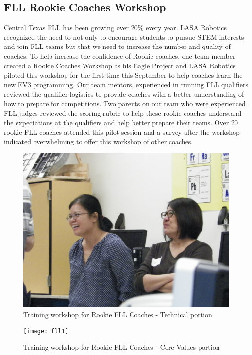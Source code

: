 \subsection{FLL Rookie Coaches Workshop}
Central Texas FLL has been growing over 20\% every year.  LASA Robotics recognized the need to not only to encourage students to pursue STEM interests and join FLL teams but that we need to increase the number and quality of coaches.  To help increase the confidence of Rookie coaches, one team member created a Rookie Coaches Workshop as his Eagle Project and LASA Robotics piloted this workshop for the first time this September to help coaches learn the new EV3 programming.   Our team mentors, experienced in running FLL qualifiers reviewed the qualifier logistics to provide coaches with a better understanding of how to prepare for competitions.  Two parents on our team who were experienced FLL judges reviewed the scoring rubric to help these rookie coaches understand the expectations at the qualifiers and help better prepare their teams.  Over 20 rookie FLL coaches attended this pilot session and a survey after the workshop indicated overwhelming to offer this workshop of other coaches.
\begin{figure}[H]
	\centering
	\includegraphics[height=0.8\linewidth]{fll}
	\caption[]{Training workshop for Rookie FLL Coaches - Technical portion}
	\label{fig:fll}
\end{figure}
\begin{figure}[H]
	\centering
	\texttt{[image: fll1]}
	\caption[]{Training workshop for Rookie FLL Coaches - Core Values portion}
	\label{fig:fll1}
\end{figure}

